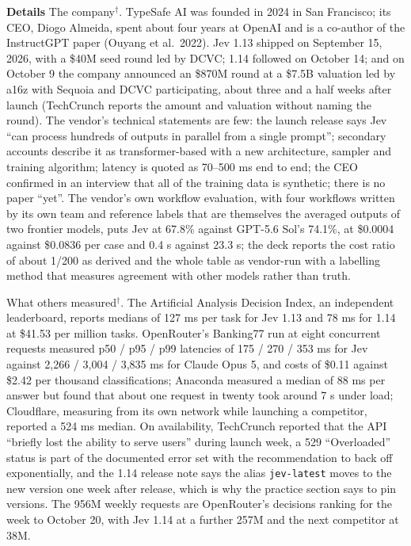 \documentclass[11pt,letterpaper]{article}
\newcommand{\para}[1]{\medskip\noindent\textbf{#1}\quad}
\begin{document}
\para{Details} The company$^\dagger$. TypeSafe AI was founded in 2024 in San Francisco; its CEO, Diogo Almeida, spent about four years at OpenAI and is a co-author of the InstructGPT paper (Ouyang et al.\ 2022). Jev 1.13 shipped on September 15, 2026, with a \$40M seed round led by DCVC; 1.14 followed on October 14; and on October 9 the company announced an \$870M round at a \$7.5B valuation led by a16z with Sequoia and DCVC participating, about three and a half weeks after launch (TechCrunch reports the amount and valuation without naming the round). The vendor's technical statements are few: the launch release says Jev ``can process hundreds of outputs in parallel from a single prompt''; secondary accounts describe it as transformer-based with a new architecture, sampler and training algorithm; latency is quoted as 70--500 ms end to end; the CEO confirmed in an interview that all of the training data is synthetic; there is no paper ``yet''. The vendor's own workflow evaluation, with four workflows written by its own team and reference labels that are themselves the averaged outputs of two frontier models, puts Jev at 67.8\% against GPT-5.6 Sol's 74.1\%, at \$0.0004 against \$0.0836 per case and 0.4 s against 23.3 s; the deck reports the cost ratio of about 1/200 as derived and the whole table as vendor-run with a labelling method that measures agreement with other models rather than truth.

What others measured$^\dagger$. The Artificial Analysis Decision Index, an independent leaderboard, reports medians of 127 ms per task for Jev 1.13 and 78 ms for 1.14 at \$41.53 per million tasks. OpenRouter's Banking77 run at eight concurrent requests measured p50 / p95 / p99 latencies of 175 / 270 / 353 ms for Jev against 2,266 / 3,004 / 3,835 ms for Claude Opus 5, and costs of \$0.11 against \$2.42 per thousand classifications; Anaconda measured a median of 88 ms per answer but found that about one request in twenty took around 7 s under load; Cloudflare, measuring from its own network while launching a competitor, reported a 524 ms median. On availability, TechCrunch reported that the API ``briefly lost the ability to serve users'' during launch week, a 529 ``Overloaded'' status is part of the documented error set with the recommendation to back off exponentially, and the 1.14 release note says the alias \texttt{jev-latest} moves to the new version one week after release, which is why the practice section says to pin versions. The 956M weekly requests are OpenRouter's decisions ranking for the week to October 20, with Jev 1.14 at a further 257M and the next competitor at 38M.
\end{document}
